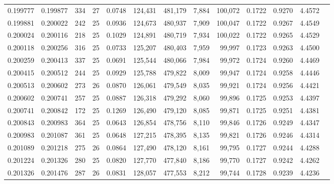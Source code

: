 \begin{tabular}{rrrrrrrrrrrrr}
0.199777 & 0.199877 &   334 &  27 &                                     0.0748 & 124,431 & 481,179 &   7,884 & 100,072 & 0.1722 & 0.9270 & 4.4572 \\
0.199881 & 0.200022 &   242 &  25 &                                     0.0936 & 124,673 & 480,937 &   7,909 & 100,047 & 0.1722 & 0.9267 & 4.4549 \\
0.200024 & 0.200116 &   218 &  25 &                                     0.1029 & 124,891 & 480,719 &   7,934 & 100,022 & 0.1722 & 0.9265 & 4.4529 \\
0.200118 & 0.200256 &   316 &  25 &                                     0.0733 & 125,207 & 480,403 &   7,959 &  99,997 & 0.1723 & 0.9263 & 4.4500 \\
0.200259 & 0.200413 &   337 &  25 &                                     0.0691 & 125,544 & 480,066 &   7,984 &  99,972 & 0.1724 & 0.9260 & 4.4469 \\
0.200415 & 0.200512 &   244 &  25 &                                     0.0929 & 125,788 & 479,822 &   8,009 &  99,947 & 0.1724 & 0.9258 & 4.4446 \\
0.200513 & 0.200602 &   273 &  26 &                                     0.0870 & 126,061 & 479,549 &   8,035 &  99,921 & 0.1724 & 0.9256 & 4.4421 \\
0.200602 & 0.200741 &   257 &  25 &                                     0.0887 & 126,318 & 479,292 &   8,060 &  99,896 & 0.1725 & 0.9253 & 4.4397 \\
0.200741 & 0.200842 &   172 &  25 &                                     0.1269 & 126,490 & 479,120 &   8,085 &  99,871 & 0.1725 & 0.9251 & 4.4381 \\
0.200843 & 0.200983 &   364 &  25 &                                     0.0643 & 126,854 & 478,756 &   8,110 &  99,846 & 0.1726 & 0.9249 & 4.4347 \\
0.200983 & 0.201087 &   361 &  25 &                                     0.0648 & 127,215 & 478,395 &   8,135 &  99,821 & 0.1726 & 0.9246 & 4.4314 \\
0.201089 & 0.201218 &   275 &  26 &                                     0.0864 & 127,490 & 478,120 &   8,161 &  99,795 & 0.1727 & 0.9244 & 4.4288 \\
0.201224 & 0.201326 &   280 &  25 &                                     0.0820 & 127,770 & 477,840 &   8,186 &  99,770 & 0.1727 & 0.9242 & 4.4262 \\
0.201326 & 0.201476 &   287 &  26 &                                     0.0831 & 128,057 & 477,553 &   8,212 &  99,744 & 0.1728 & 0.9239 & 4.4236 \\

\end{tabular}
